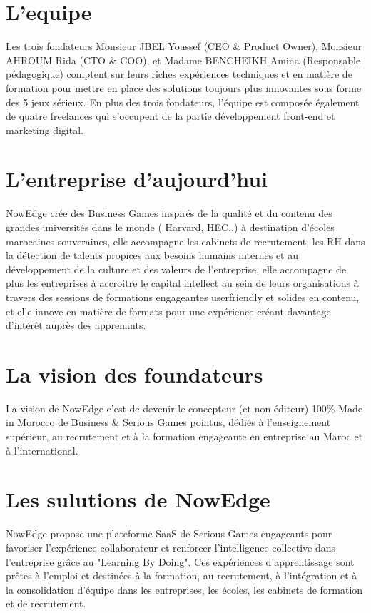 \section{L'equipe}

Les trois fondateurs Monsieur JBEL Youssef (CEO \& Product Owner), Monsieur AHROUM Rida (CTO \& COO), et Madame BENCHEIKH Amina (Responsable
pédagogique) comptent sur leurs riches expériences techniques et en matière de
formation pour mettre en place des solutions toujours plus innovantes sous forme des 5
jeux sérieux. En plus des trois fondateurs, l’équipe est composée également de quatre
freelances qui s’occupent de la partie développement front-end et marketing digital.
 
\section{L'entreprise d'aujourd'hui}

NowEdge crée des Business Games inspirés de la qualité et du contenu des grandes
universités dans le monde ( Harvard, HEC..) à destination d’écoles marocaines souveraines, elle
accompagne les cabinets de recrutement, les RH dans la détection de talents propices aux
besoins humains internes et au développement de la culture et des valeurs de l’entreprise, elle
accompagne de plus les entreprises à accroitre le capital intellect au sein de leurs organisations à
travers des sessions de formations engageantes userfriendly et solides en contenu, et elle innove
en matière de formats pour une expérience créant davantage d’intérêt auprès des apprenants.



\section{La vision des foundateurs}

La vision de NowEdge c’est de devenir le concepteur (et non éditeur) 100\% Made in Morocco de Business \& Serious Games pointus, dédiés à l’enseignement supérieur, au
recrutement et à la formation engageante en entreprise au Maroc et à l'international.
 

\section{Les sulutions de NowEdge}

NowEdge propose une plateforme SaaS de Serious Games engageants pour favoriser
l'expérience collaborateur et renforcer l'intelligence collective dans l'entreprise grâce au
"Learning By Doing". Ces expériences d'apprentissage sont prêtes à l'emploi et destinées à la
formation, au recrutement, à l'intégration et à la consolidation d'équipe dans les entreprises, les
écoles, les cabinets de formation et de recrutement.


